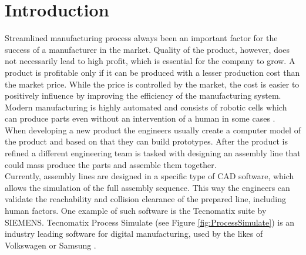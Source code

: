 \chapter{Introduction}
\label{ch:introduction}
\graphicspath{ {chapters/Introduction/} }

Streamlined manufacturing process always been an important factor for the success of a manufacturer in the market. 
Quality of the product, however, does not necessarily lead to high profit, which is essential for the company to grow. 
A product is profitable only if it can be produced with a lesser production cost than the market price. 
While the price is controlled by the market, the cost is easier to positively influence by improving the efficiency of the manufacturing system. 
Modern manufacturing is highly automated and consists of robotic cells which can produce parts even without an intervention of a human in some cases \cite{VirtualCommisioning}. \\

When developing a new product the engineers usually create a computer model of the product and based on that they can build prototypes. After the product is refined a different engineering team is tasked with designing an assembly line that could mass produce the parts and assemble them together. \\
 
Currently, assembly lines are designed in a specific type of CAD software, which allows the simulation of the full assembly sequence.
This way the engineers can validate the reachability and collision clearance of the prepared line, including human factors.
One example of such software is the Tecnomatix suite by SIEMENS. Tecnomatix Process Simulate (see Figure \ref{fig:ProcessSimulate}) is an industry leading software for digital manufacturing, used by the likes of Volkswagen or Samsung \cite{TecnomatixCustomers}. \\ 

